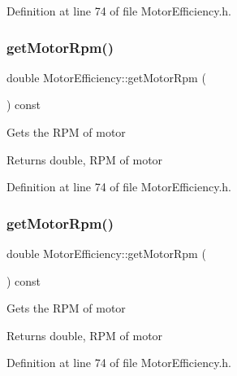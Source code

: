 Definition at line 74 of file Motor\+Efficiency.\+h.

\mbox{\label{class_motor_efficiency_ab29655f487e90a73246be6e9bc67c36a}} 
\subsubsection{\texorpdfstring{get\+Motor\+Rpm()}{getMotorRpm()}\hspace{0.1cm}{\footnotesize\ttfamily [2/3]}}
{\footnotesize\ttfamily double Motor\+Efficiency\+::get\+Motor\+Rpm (\begin{DoxyParamCaption}{ }\end{DoxyParamCaption}) const\hspace{0.3cm}{\ttfamily [inline]}}

Gets the R\+PM of motor \begin{DoxyReturn}{Returns}
double, R\+PM of motor 
\end{DoxyReturn}


Definition at line 74 of file Motor\+Efficiency.\+h.

\mbox{\label{class_motor_efficiency_ab29655f487e90a73246be6e9bc67c36a}} 
\subsubsection{\texorpdfstring{get\+Motor\+Rpm()}{getMotorRpm()}\hspace{0.1cm}{\footnotesize\ttfamily [3/3]}}
{\footnotesize\ttfamily double Motor\+Efficiency\+::get\+Motor\+Rpm (\begin{DoxyParamCaption}{ }\end{DoxyParamCaption}) const\hspace{0.3cm}{\ttfamily [inline]}}

Gets the R\+PM of motor \begin{DoxyReturn}{Returns}
double, R\+PM of motor 
\end{DoxyReturn}


Definition at line 74 of file Motor\+Efficiency.\+h.

\mbox{\label{class_motor_efficiency_a7a5ad8d01fdc0a3bf93d952752487496}} 
